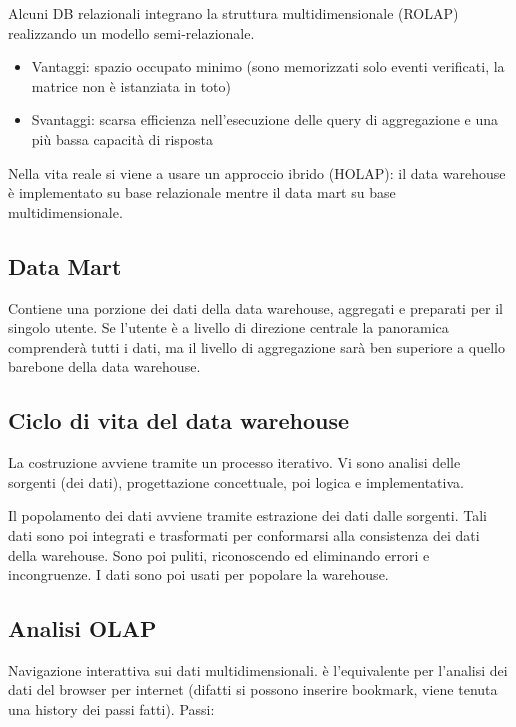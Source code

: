 Alcuni DB relazionali integrano la struttura multidimensionale (ROLAP)
realizzando un modello semi-relazionale.

\begin{itemize}

\item
  Vantaggi: spazio occupato minimo (sono memorizzati solo eventi
  verificati, la matrice non \`e istanziata in toto)
\item
  Svantaggi: scarsa efficienza nell'esecuzione delle query di
  aggregazione e una pi\`u bassa capacit\`a di risposta
\end{itemize}

Nella vita reale si viene a usare un approccio ibrido (HOLAP): il data
warehouse \`e implementato su base relazionale mentre il data mart su base
multidimensionale.

\subsection{Data Mart}\label{data-mart}

Contiene una porzione dei dati della data warehouse, aggregati e
preparati per il singolo utente. Se l'utente \`e a livello di direzione
centrale la panoramica comprender\`a tutti i dati, ma il livello di
aggregazione sar\`a ben superiore a quello barebone della data warehouse.

\subsection{Ciclo di vita del data
warehouse}\label{ciclo-di-vita-del-data-warehouse}

La costruzione avviene tramite un processo iterativo. Vi sono analisi
delle sorgenti (dei dati), progettazione concettuale, poi logica e
implementativa.

Il popolamento dei dati avviene tramite estrazione dei dati dalle
sorgenti. Tali dati sono poi integrati e trasformati per conformarsi
alla consistenza dei dati della warehouse. Sono poi puliti, riconoscendo
ed eliminando errori e incongruenze. I dati sono poi usati per popolare
la warehouse.

\subsection{Analisi OLAP}\label{analisi-olap}

Navigazione interattiva sui dati multidimensionali. \`e l'equivalente per
l'analisi dei dati del browser per internet (difatti si possono inserire
bookmark, viene tenuta una history dei passi fatti). Passi:

